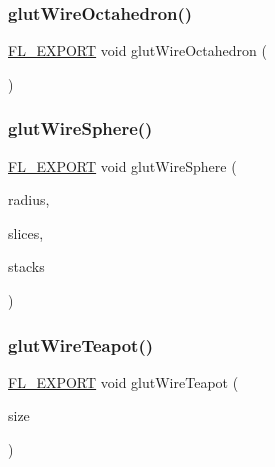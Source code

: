 \subsubsection{\texorpdfstring{glut\+Wire\+Octahedron()}{glutWireOctahedron()}}
{\footnotesize\ttfamily \hyperlink{_fl___export_8_h_aa9ba29a18aee9d738370a06eeb4470fc}{F\+L\+\_\+\+E\+X\+P\+O\+RT} void glut\+Wire\+Octahedron (\begin{DoxyParamCaption}{ }\end{DoxyParamCaption})}

\mbox{\label{glut_8_h_a37d8227b051ae7870400f29c3d8e3569}} 
\subsubsection{\texorpdfstring{glut\+Wire\+Sphere()}{glutWireSphere()}}
{\footnotesize\ttfamily \hyperlink{_fl___export_8_h_aa9ba29a18aee9d738370a06eeb4470fc}{F\+L\+\_\+\+E\+X\+P\+O\+RT} void glut\+Wire\+Sphere (\begin{DoxyParamCaption}\item[{G\+Ldouble}]{radius,  }\item[{G\+Lint}]{slices,  }\item[{G\+Lint}]{stacks }\end{DoxyParamCaption})}

\mbox{\label{glut_8_h_acde4a7f3fa66d21953bfc363c50786e1}} 
\subsubsection{\texorpdfstring{glut\+Wire\+Teapot()}{glutWireTeapot()}}
{\footnotesize\ttfamily \hyperlink{_fl___export_8_h_aa9ba29a18aee9d738370a06eeb4470fc}{F\+L\+\_\+\+E\+X\+P\+O\+RT} void glut\+Wire\+Teapot (\begin{DoxyParamCaption}\item[{G\+Ldouble}]{size }\end{DoxyParamCaption})}

\mbox{\label{glut_8_h_a15a892ef23ddf680b15350e6e9a5a496}} 
